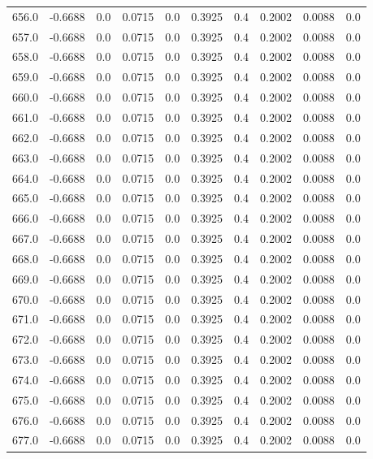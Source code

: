 \begin{longtable}{lrrrrrrrrr}
656.0 & -0.6688 & 0.0 & 0.0715 & 0.0 & 0.3925 & 0.4 & 0.2002 & 0.0088 & 0.0 \\
657.0 & -0.6688 & 0.0 & 0.0715 & 0.0 & 0.3925 & 0.4 & 0.2002 & 0.0088 & 0.0 \\
658.0 & -0.6688 & 0.0 & 0.0715 & 0.0 & 0.3925 & 0.4 & 0.2002 & 0.0088 & 0.0 \\
659.0 & -0.6688 & 0.0 & 0.0715 & 0.0 & 0.3925 & 0.4 & 0.2002 & 0.0088 & 0.0 \\
660.0 & -0.6688 & 0.0 & 0.0715 & 0.0 & 0.3925 & 0.4 & 0.2002 & 0.0088 & 0.0 \\
661.0 & -0.6688 & 0.0 & 0.0715 & 0.0 & 0.3925 & 0.4 & 0.2002 & 0.0088 & 0.0 \\
662.0 & -0.6688 & 0.0 & 0.0715 & 0.0 & 0.3925 & 0.4 & 0.2002 & 0.0088 & 0.0 \\
663.0 & -0.6688 & 0.0 & 0.0715 & 0.0 & 0.3925 & 0.4 & 0.2002 & 0.0088 & 0.0 \\
664.0 & -0.6688 & 0.0 & 0.0715 & 0.0 & 0.3925 & 0.4 & 0.2002 & 0.0088 & 0.0 \\
665.0 & -0.6688 & 0.0 & 0.0715 & 0.0 & 0.3925 & 0.4 & 0.2002 & 0.0088 & 0.0 \\
666.0 & -0.6688 & 0.0 & 0.0715 & 0.0 & 0.3925 & 0.4 & 0.2002 & 0.0088 & 0.0 \\
667.0 & -0.6688 & 0.0 & 0.0715 & 0.0 & 0.3925 & 0.4 & 0.2002 & 0.0088 & 0.0 \\
668.0 & -0.6688 & 0.0 & 0.0715 & 0.0 & 0.3925 & 0.4 & 0.2002 & 0.0088 & 0.0 \\
669.0 & -0.6688 & 0.0 & 0.0715 & 0.0 & 0.3925 & 0.4 & 0.2002 & 0.0088 & 0.0 \\
670.0 & -0.6688 & 0.0 & 0.0715 & 0.0 & 0.3925 & 0.4 & 0.2002 & 0.0088 & 0.0 \\
671.0 & -0.6688 & 0.0 & 0.0715 & 0.0 & 0.3925 & 0.4 & 0.2002 & 0.0088 & 0.0 \\
672.0 & -0.6688 & 0.0 & 0.0715 & 0.0 & 0.3925 & 0.4 & 0.2002 & 0.0088 & 0.0 \\
673.0 & -0.6688 & 0.0 & 0.0715 & 0.0 & 0.3925 & 0.4 & 0.2002 & 0.0088 & 0.0 \\
674.0 & -0.6688 & 0.0 & 0.0715 & 0.0 & 0.3925 & 0.4 & 0.2002 & 0.0088 & 0.0 \\
675.0 & -0.6688 & 0.0 & 0.0715 & 0.0 & 0.3925 & 0.4 & 0.2002 & 0.0088 & 0.0 \\
676.0 & -0.6688 & 0.0 & 0.0715 & 0.0 & 0.3925 & 0.4 & 0.2002 & 0.0088 & 0.0 \\
677.0 & -0.6688 & 0.0 & 0.0715 & 0.0 & 0.3925 & 0.4 & 0.2002 & 0.0088 & 0.0 \\

\end{longtable}
